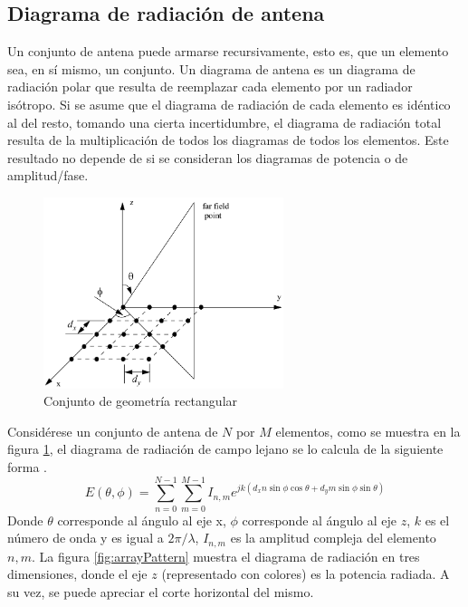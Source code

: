 \subsection{Diagrama de radiación de antena}

Un conjunto de antena puede armarse recursivamente, esto es, que un elemento sea, en sí mismo, un conjunto. Un diagrama de antena es
un diagrama de radiación polar que resulta de reemplazar cada elemento por un radiador isótropo. Si se asume que el diagrama de
radiación de cada elemento es idéntico al del resto, tomando una cierta incertidumbre, el diagrama de radiación total resulta de
la multiplicación de todos los diagramas de todos los elementos. Este resultado no depende de si se consideran los diagramas de
potencia o de amplitud/fase. 

\begin{figure}[H]
 \centering
 \includegraphics[width=7cm]{gfx/rectangularArrayGeometry.png}
 \caption{Conjunto de geometría rectangular \cite{Mahafza2004}}
 \label{fig:arrayGeometry}
\end{figure}

Considérese un conjunto de antena de $N$ por $M$ elementos, como se muestra en la figura \ref{fig:arrayGeometry}, el diagrama de
radiación de campo lejano se lo calcula de la siguiente forma \cite{Mahafza2004}.
\begin{equation}
	E(\theta, \phi) = \sum_{n=0}^{N-1}\sum_{m=0}^{M-1} I_{n,m} e^{jk(d_xn\sin\phi\cos\theta + d_ym\sin\phi\sin\theta)}
\end{equation}
Donde $\theta$ corresponde al ángulo al eje x, $\phi$ corresponde al ángulo al eje $z$, $k$ es el número de onda y es igual
a $2\pi/\lambda$, $I_{n,m}$ es la amplitud compleja del elemento $n,m$. La figura \ref{fig:arrayPattern} muestra el diagrama de
radiación en tres dimensiones, donde el eje $z$ (representado con colores) es la potencia radiada. A su vez, se puede apreciar 
el corte horizontal del mismo.

